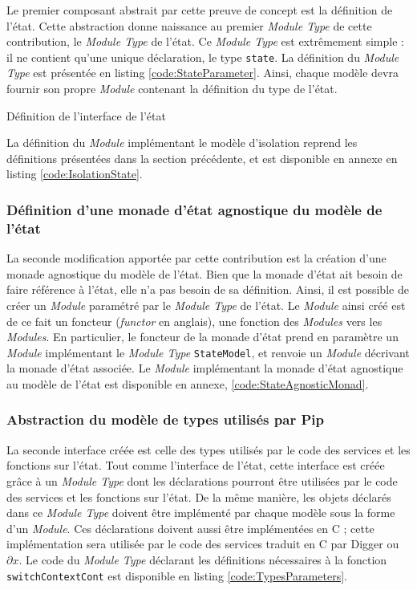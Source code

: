 			Le premier composant abstrait par cette preuve de concept est la définition de l'état. Cette abstraction donne naissance au premier \emph{Module Type} de cette contribution, le \emph{Module Type} de l'état. Ce \emph{Module Type} est extrêmement simple : il ne contient qu'une unique déclaration, le type \texttt{state}. La définition du \emph{Module Type} est présentée en listing \ref{code:StateParameter}. Ainsi, chaque modèle devra fournir son propre \emph{Module} contenant la définition du type de l'état.
			\begin{listing}[!ht]
				\caption{Définition de l'interface de l'état}
				\label{code:StateParameter}
			\end{listing}

			La définition du \emph{Module} implémentant le modèle d'isolation reprend les définitions présentées dans la section précédente, et est disponible en annexe en listing \ref{code:IsolationState}.

			\subsubsection{Définition d'une monade d'état agnostique du modèle de l'état}

			La seconde modification apportée par cette contribution est la création d'une monade agnostique du modèle de l'état. Bien que la monade d'état ait besoin de faire référence à l'état, elle n'a pas besoin de sa définition. Ainsi, il est possible de créer un \emph{Module} paramétré par le \emph{Module Type} de l'état. Le \emph{Module} ainsi créé est de ce fait un foncteur (\emph{functor} en anglais), une fonction des \emph{Modules} vers les \emph{Modules}. En particulier, le foncteur de la monade d'état prend en paramètre un \emph{Module} implémentant le \emph{Module Type} \texttt{StateModel}, et renvoie un \emph{Module} décrivant la monade d'état associée. Le \emph{Module} implémentant la monade d'état agnostique au modèle de l'état est disponible en annexe, \ref{code:StateAgnosticMonad}.

			\subsubsection{Abstraction du modèle de types utilisés par Pip}

			La seconde interface créée est celle des types utilisés par le code des services et les fonctions sur l'état. Tout comme l'interface de l'état, cette interface est créée grâce à un \emph{Module Type} dont les déclarations pourront être utilisées par le code des services et les fonctions sur l'état. De la même manière, les objets déclarés dans ce \emph{Module Type} doivent être implémenté par chaque modèle sous la forme d'un \emph{Module}. Ces déclarations doivent aussi être implémentées en C ; cette implémentation sera utilisée par le code des services traduit en C par Digger ou $\partial x$. Le code du \emph{Module Type} déclarant les définitions nécessaires à la fonction \texttt{switchContextCont} est disponible en listing \ref{code:TypesParameters}.

